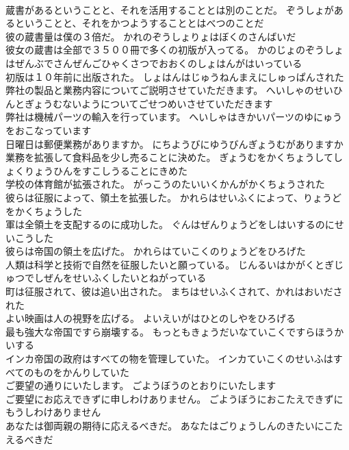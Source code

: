 \documentclass[8pt]{extreport}
\begin{document}
\begin{CJK}{UTF8}{min}
\\	蔵書があるということと、それを活用することとは別のことだ。	ぞうしょがあるということと、それをかつようすることとはべつのことだ 
\\	彼の蔵書量は僕の３倍だ。	かれのぞうしょりょはぼくのさんばいだ 
\\	彼女の蔵書は全部で３５００冊で多くの初版が入ってる。	かのじょのぞうしょはぜんぶでさんぜんごひゃくさつでおおくのしょはんがはいっている 
\\	初版は１０年前に出版された。	しょはんはじゅうねんまえにしゅっぱんされた 
\\	弊社の製品と業務内容についてご説明させていただきます。	へいしゃのせいひんとぎょうむないようについてごせつめいさせていただきます 
\\	弊社は機械パーツの輸入を行っています。	へいしゃはきかいパーツのゆにゅうをおこなっています 
\\	日曜日は郵便業務がありますか。	にちようびにゆうびんぎょうむがありますか 
\\	業務を拡張して食料品を少し売ることに決めた。	ぎょうむをかくちょうしてしょくりょうひんをすこしうることにきめた 
\\	学校の体育館が拡張された。	がっこうのたいいくかんがかくちょうされた 
\\	彼らは征服によって、領土を拡張した。	かれらはせいふくによって、りょうどをかくちょうした 
\\	軍は全領土を支配するのに成功した。	ぐんはぜんりょうどをしはいするのにせいこうした 
\\	彼らは帝国の領土を広げた。	かれらはていこくのりょうどをひろげた 
\\	人類は科学と技術で自然を征服したいと願っている。	じんるいはかがくとぎじゅつでしぜんをせいふくしたいとねがっている 
\\	町は征服されて、彼は追い出された。	まちはせいふくされて、かれはおいだされた 
\\	よい映画は人の視野を広げる。	よいえいがはひとのしやをひろげる 
\\	最も強大な帝国ですら崩壊する。	もっともきょうだいなていこくですらほうかいする 
\\	インカ帝国の政府はすべての物を管理していた。	インカていこくのせいふはすべてのものをかんりしていた 
\\	ご要望の通りにいたします。	ごようぼうのとおりにいたします 
\\	ご要望にお応えできずに申しわけありません。	ごようぼうにおこたえできずにもうしわけありません 
\\	あなたは御両親の期待に応えるべきだ。	あなたはごりょうしんのきたいにこたえるべきだ 

\end{CJK}
\end{document}
